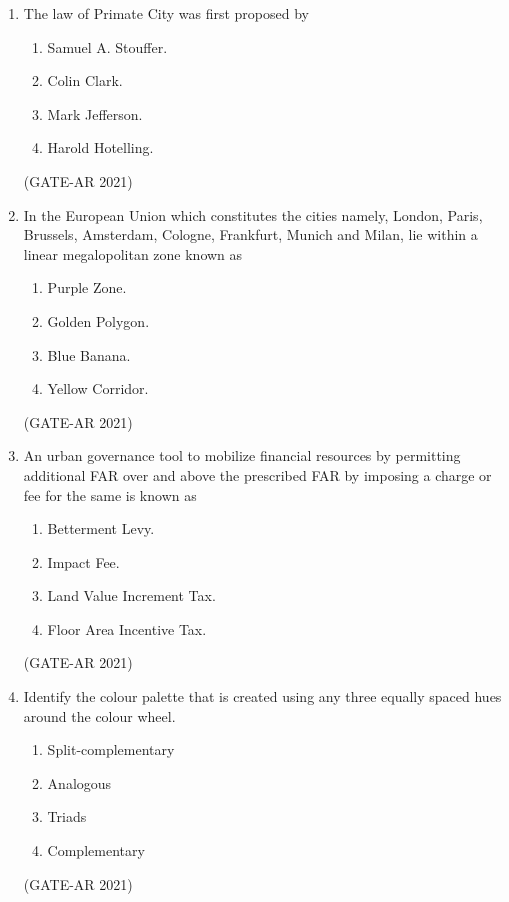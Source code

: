 \documentclass[a4paper,10pt]{article}
\begin{document}
\begin{enumerate}
    \item The law of Primate City was first proposed by 
    \begin{multicols}{2}
    \begin{enumerate}
        \item Samuel A. Stouffer.
        \item Colin Clark.
        \item Mark Jefferson.
        \item Harold Hotelling.
    \end{enumerate}
    \end{multicols}
    \hfill (GATE-AR 2021)

    \item In the European Union which constitutes the cities namely, London, Paris, Brussels, Amsterdam, Cologne, Frankfurt, Munich and Milan, lie within a linear megalopolitan zone known as 
    \begin{multicols}{2}
    \begin{enumerate}
        \item Purple Zone.
        \item Golden Polygon.
        \item Blue Banana.
        \item Yellow Corridor.
    \end{enumerate}
    \end{multicols}
    \hfill (GATE-AR 2021)

    \item An urban governance tool to mobilize financial resources by permitting additional FAR over and above the prescribed FAR by imposing a charge or fee for the same is known as 
    \begin{enumerate}
        \item Betterment Levy.
        \item Impact Fee.
        \item Land Value Increment Tax.
        \item Floor Area Incentive Tax.
    \end{enumerate}
    \hfill (GATE-AR 2021)

    \item Identify the colour palette that is created using any three equally spaced hues around the colour wheel. 
    \begin{multicols}{2}
    \begin{enumerate}
        \item Split-complementary
        \item Analogous
        \item Triads
        \item Complementary
    \end{enumerate}
    \end{multicols}
    \hfill (GATE-AR 2021)


\end{enumerate}
\end{document}
